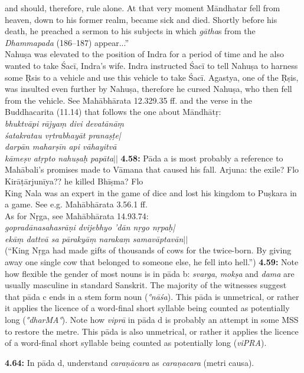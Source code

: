 \documentclass{article}
\newcommand{\vsnum}[1]{\textbf{#1}}
\newcommand{\skt}[1]{\textit{#1}}
\begin{document}
and should, therefore, rule alone. At that very moment Māndhatar fell from heaven, down to his former realm, became sick and died. Shortly before his death, he preached a sermon to his subjects in which \textit{gātha}s from the \textit{Dhammapada} (186--187) appear...''  \\ Nahuṣa was elevated to the position of Indra for a period of time and he also wanted to take Śacī, Indra's wife. Indra instructed Śacī to tell Nahuṣa to harness some Ṛsis to a vehicle and use this vehicle to take Śacī. Agastya, one of the Ṛṣis, was insulted even further by Nahuṣa, therefore he cursed Nahuṣa, who then fell from the vehicle. See Mahābhārata 12.329.35 ff. and the verse in the Buddhacarita (11.14) that follows the one about Māndhātṛ: \\ \textit{ bhuktvāpi rājyaṃ divi devatānāṃ \\ śatakratau vṛtrabhayāt pranaṣṭe|\\ darpān maharṣīn api vāhayitvā \\ kāmeṣv atṛpto nahuṣaḥ papāta$||$}  \vsnum{4.58: }Pāda a is most probably a reference to Mahābali's promises made to Vāmana that caused his fall. Arjuna: the exile? Flo Kirāṭārjunīya?? he killed Bhīṣma? Flo \\ King Nala was an expert in the game of dice and lost his kingdom to Puṣkara in a game. See e.g. Mahābhārata 3.56.1 ff. \\ As for Nṛga, see Mahābhārata 14.93.74: \\ \textit{ gopradānasahasrāṇi dvijebhyo 'dān nṛgo nṛpaḥ|\\ ekāṃ dattvā sa pārakyāṃ narakaṃ samavāptavān$||$\\  } (``King Nṛga had made gifts of thousands of cows for the twice-born. By giving away one single cow that belonged to someone else, he fell into hell.'')  \vsnum{4.59: }Note how flexible the gender of most nouns is in pāda b: \skt{svarga}, \skt{mokṣa} and \skt{dama} are usually masculine in standard Sanskrit. The majority of the witnesses suggest that pāda c ends in a stem form noun (\skt{°nāśa}). This pāda is unmetrical, or rather it applies the licence of a word-final short syllable being counted as potentially long (\skt{°dharMA°}). Note how \skt{viprā} in pāda d is probably an attempt in some MSS to restore the metre. This pāda is also unmetrical, or rather it applies the licence of a word-final short syllable being counted as potentially long (\skt{viPRA}).

\vsnum{4.64: }In pāda d, understand \skt{caraṇācara} as \skt{caraṇacara} (metri causa).
\end{document}
